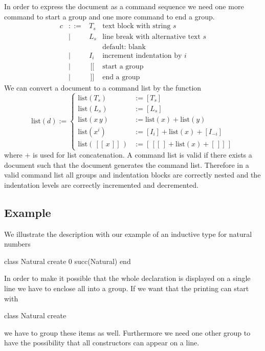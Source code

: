 \documentclass[12pt]{article}
\def\cs{\text{cs}}
\def\GS{\,[\![\,}
\def\GE{\,]\!]\,}
\def\group#1{\GS #1 \GE}
\begin{document}
In order to express the document as a command sequence we need one more
command to start a group and one more command to end a group.
%
$$
\begin{array}{llll}
  c & ::= & T_s         & \text{text block with string } s
  \\
    & \mid &  L_s       & \text{line break with alternative text } s
  \\ & & &\text{default: blank}
  \\
    & \mid &  I_i     & \text{increment indentation by } i
  \\
    & \mid &  \GS       & \text{start a group }
  \\
    & \mid &  \GE       & \text{end a group }
\end{array}
$$%
We can convert a document to a command list by the function
{\def\cs{\text{list}}
  $$
  \cs(d) :=
  \begin{cases}
    \cs(T_s) & := [T_s]
    \\
    \cs(L_s) & := [ L_s ]
    \\
    \cs(x\, y) & := \cs(x) + \cs(y)
    \\
    \cs(x^i)   & := [I_i] + \cs(x) + [I_{-i}]
    \\
    \cs(\group{x})  & := [\GS] + \cs(x) + [\GE]
  \end{cases}
  $$%
  where $+$ is used for list concatenation.
}
%
A command list is valid if there exists a document such that the document
generates the command list. Therefore in a valid command list all groups and
indentation blocks are correctly nested and the indentation levels are
correctly incremented and decremented.


\subsection{Example}

We illustrate the description with our example of an inductive type for
natural numbers
\begin{alba}
    class
        Natural
    create
        0
        succ(Natural)
    end
\end{alba}
In order to make it possible that the whole declaration is displayed on a
single line we have to enclose all into a group. If we want that the printing
can start with
\begin{alba}
    class Natural create
\end{alba}
%
we have to group these items as well. Furthermore we need one other group to
have the possibility that all constructors can appear on a line.
\end{document}
